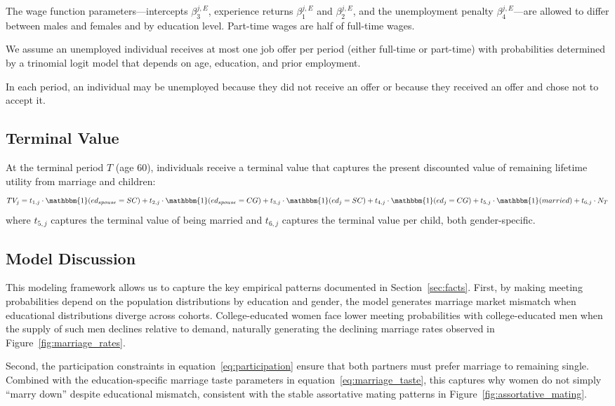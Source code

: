 \documentclass[12pt]{article}
\begin{document}
The wage function parameters---intercepts $\beta_3^{j,E}$, experience returns $\beta_1^{j,E}$ and $\beta_2^{j,E}$, and the unemployment penalty $\beta_4^{j,E}$---are allowed to differ between males and females and by education level. Part-time wages are half of full-time wages.

We assume an unemployed individual receives at most one job offer per period (either full-time or part-time) with probabilities determined by a trinomial logit model that depends on age, education, and prior employment.

In each period, an individual may be unemployed because they did not receive an offer or because they received an offer and chose not to accept it.

\subsection{Terminal Value}

At the terminal period $T$ (age 60), individuals receive a terminal value that captures the present discounted value of remaining lifetime utility from marriage and children:
\begin{equation}
TV_j = t_{1,j} \cdot \mathbbm{1}(ed_{spouse} = SC) + t_{2,j} \cdot \mathbbm{1}(ed_{spouse} = CG) + t_{3,j} \cdot \mathbbm{1}(ed_j = SC) + t_{4,j} \cdot \mathbbm{1}(ed_j = CG) + t_{5,j} \cdot \mathbbm{1}(married) + t_{6,j} \cdot N_T
\label{eq:terminal}
\end{equation}
where $t_{5,j}$ captures the terminal value of being married and $t_{6,j}$ captures the terminal value per child, both gender-specific.

\subsection{Model Discussion}

This modeling framework allows us to capture the key empirical patterns documented in Section~\ref{sec:facts}. First, by making meeting probabilities depend on the population distributions by education and gender, the model generates marriage market mismatch when educational distributions diverge across cohorts. College-educated women face lower meeting probabilities with college-educated men when the supply of such men declines relative to demand, naturally generating the declining marriage rates observed in Figure~\ref{fig:marriage_rates}.

Second, the participation constraints in equation~\eqref{eq:participation} ensure that both partners must prefer marriage to remaining single. Combined with the education-specific marriage taste parameters in equation~\eqref{eq:marriage_taste}, this captures why women do not simply ``marry down'' despite educational mismatch, consistent with the stable assortative mating patterns in Figure~\ref{fig:assortative_mating}.
\end{document}
